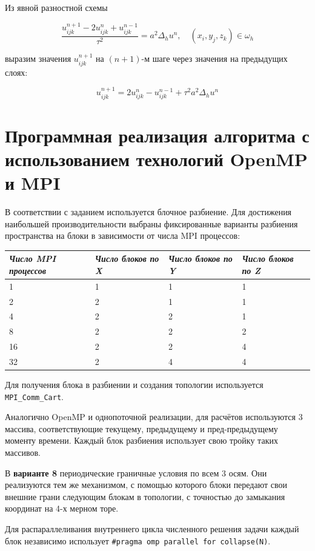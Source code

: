 \documentclass[a4paper,hidelinks,12pt]{article}
\begin{document}
Из явной разностной схемы 

\[ \frac{u^{n+1}_{ijk} - 2u^n_{ijk} + u^{n-1}_{ijk}}{ \tau^2} = a^2 \Delta_h u^n,\quad (x_i, y_j, z_k) \in \omega_h \]

\noindent выразим значения $u^{n+1}_{ijk}$ на $(n+1)$-м шаге через значения на предыдущих слоях:

\[ u^{n+1}_{ijk} = 2u^n_{ijk} - u^{n-1}_{ijk} + \tau^2 a^2 \Delta_h u^n \]

\section{Программная реализация алгоритма с использованием технологий OpenMP и MPI}

В соответствии с заданием используется блочное разбиение. Для достижения наибольшей производительности выбраны фиксированные варианты разбиения пространства на блоки в зависимости от числа MPI процессов:

\begin{table}[H]
\centering
\begin{tabular}{|p{2cm}|p{2cm}|p{2cm}|p{2cm}|}
    \hline
    \textit{Число MPI процессов} & \textit{Число блоков по X} & \textit{Число блоков по Y} & \textit{Число блоков по Z} \\
    \hline
    1 & 1 & 1 & 1 \\
    2 & 2 & 1 & 1 \\
    4 & 2 & 2 & 1 \\
    8 & 2 & 2 & 2 \\
    16 & 2 & 2 & 4 \\
    32 & 2 & 4 & 4 \\
    \hline
\end{tabular}
\end{table}

Для получения блока в разбиении и создания топологии используется \texttt{MPI\_Comm\_Cart}.

Аналогично OpenMP и однопоточной реализации, для расчётов используются 3 массива, соответствующие текущему, предыдущему и пред-предыдущему моменту времени. Каждый блок разбиения использует свою тройку таких массивов.

В \textbf{варианте 8} периодические граничные условия по всем 3 осям. Они реализуются тем же механизмом, с помощью которого блоки передают свои внешние грани следующим блокам в топологии, с точностью до замыкания координат на 4-х мерном торе.

Для распараллеливания внутреннего цикла численного решения задачи каждый блок независимо использует \texttt{\#pragma omp parallel for collapse(N)}.
\end{document}
